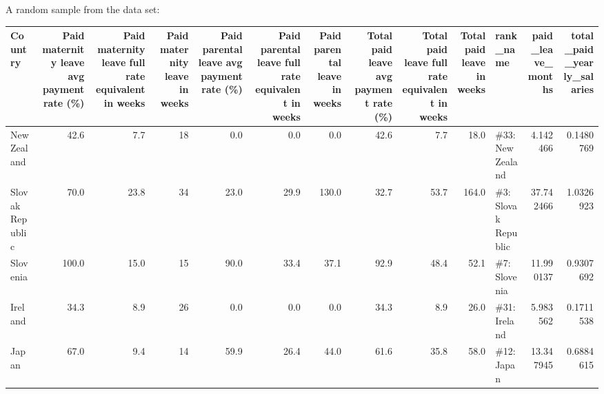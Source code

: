 \documentclass[]{book}
\theoremstyle{definition}
\theoremstyle{definition}
\theoremstyle{definition}
\theoremstyle{remark}
\begin{document}
A random sample from the data set:

\begin{tabular}{l|r|r|r|r|r|r|r|r|r|l|r|r}
\hline
Country & Paid maternity leave avg payment rate (\%) & Paid maternity leave full rate equivalent in weeks & Paid maternity leave in weeks & Paid parental leave avg payment rate (\%) & Paid parental leave full rate equivalent in weeks & Paid parental leave in weeks & Total paid leave avg payment rate (\%) & Total paid leave full rate equivalent in weeks & Total paid leave in weeks & rank\_name & paid\_leave\_months & total\_paid\_yearly\_salaries\\
\hline
New Zealand & 42.6 & 7.7 & 18 & 0.0 & 0.0 & 0.0 & 42.6 & 7.7 & 18.0 & \#33: New Zealand & 4.142466 & 0.1480769\\
\hline
Slovak Republic & 70.0 & 23.8 & 34 & 23.0 & 29.9 & 130.0 & 32.7 & 53.7 & 164.0 & \#3: Slovak Republic & 37.742466 & 1.0326923\\
\hline
Slovenia & 100.0 & 15.0 & 15 & 90.0 & 33.4 & 37.1 & 92.9 & 48.4 & 52.1 & \#7: Slovenia & 11.990137 & 0.9307692\\
\hline
Ireland & 34.3 & 8.9 & 26 & 0.0 & 0.0 & 0.0 & 34.3 & 8.9 & 26.0 & \#31: Ireland & 5.983562 & 0.1711538\\
\hline
Japan & 67.0 & 9.4 & 14 & 59.9 & 26.4 & 44.0 & 61.6 & 35.8 & 58.0 & \#12: Japan & 13.347945 & 0.6884615\\
\hline
\end{tabular}
\end{document}
